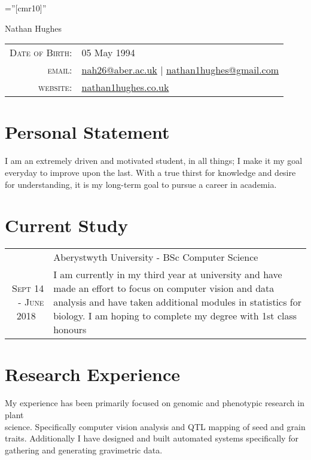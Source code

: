 \documentclass[a4paper,9pt]{article}
\begin{document}
\pagestyle{empty} %

\font\fb=''[cmr10]'' %

\par{\centering
  {\Huge Nathan {Hughes}
  }\bigskip\par}


\begin{center}
  \begin{tabular}{rl}
    \textsc{Date of Birth:} & 05 		May 1994 \\
    \textsc{email:}     & \href{mailto:nah26@aber.ac.uk}{nah26@aber.ac.uk} | \href{mailto:nathan1hughes@gmail.com}{nathan1hughes@gmail.com} \\
    \textsc{website:}  & \href{nathan1hughes.co.uk}{nathan1hughes.co.uk}       
  \end{tabular}
\end{center}


\section{Personal Statement}
I am an extremely driven and motivated student, in all things; I make it my goal everyday to improve upon the last. With a true thirst for knowledge and desire for understanding, it is my long-term goal to pursue a career in academia.
\section{Current Study}


\begin{tabular}{rp{11cm}}
  &Aberystwyth University - BSc Computer Science\\\textsc{Sept 14 - June 2018 \  }&\footnotesize{I am currently in my third year at university and have made an effort to focus on computer vision and data analysis and have taken additional modules in statistics for biology. I am hoping to complete my degree with 1st class honours}
 \end{tabular}

\section{Research Experience}
My experience has been primarily focused on genomic and phenotypic research in plant \\science. Specifically computer vision analysis and QTL mapping of seed and grain traits. Additionally I have designed and built automated systems specifically for gathering and generating gravimetric data.
\end{document}
